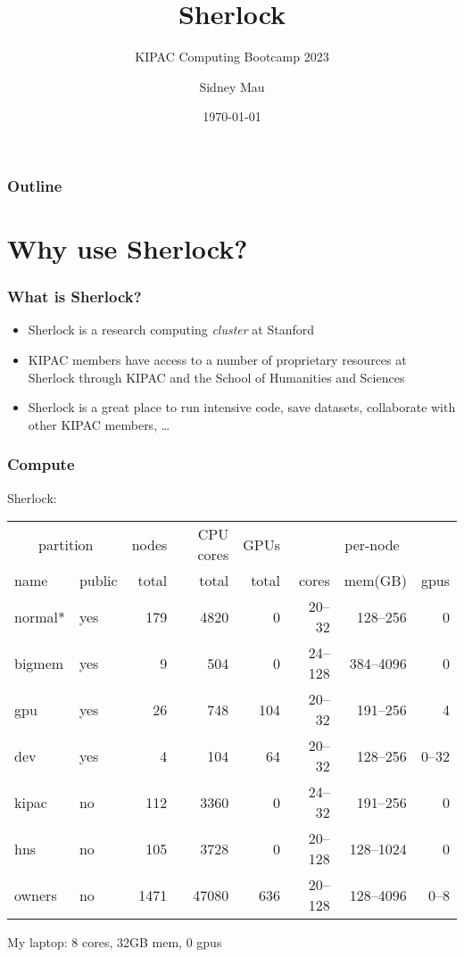 \documentclass[aspectratio=169]{beamer}
\title{Sherlock}
\subtitle{KIPAC Computing Bootcamp 2023}
\author[S. Mau]{Sidney Mau}
\institute[Stanford]{Stanford University}
\date[\today]{\today}
\begin{document}

\frame{\titlepage}

\begin{frame}
	\frametitle{Outline}
	\tableofcontents
\end{frame}


\section{Why use Sherlock?}

\frame{\sectionpage}

\begin{frame}
	\frametitle{What is Sherlock?}
	\begin{itemize}
		\item Sherlock is a research computing \emph{cluster} at Stanford
		\item KIPAC members have access to a number of proprietary resources at Sherlock through KIPAC and the School of Humanities and Sciences
		\item Sherlock is a great place to run intensive code, save datasets, collaborate with other KIPAC members, \dots
	\end{itemize}
\end{frame}

\begin{frame}
	\frametitle{Compute}
	Sherlock:
	\begin{center}
		\begin{tabular}{|l|l||r|r|r||r|r|r|}
			\hline
			\multicolumn{2}{|c||}{partition} & nodes & CPU cores & GPUs & \multicolumn{3}{|c|}{per-node} \\
			 name      &  public & total &     total & total &  cores &  mem(GB) & gpus \\
			\hline
			 normal*   &  yes    &   179 &      4820 &     0 &  20--32 &  128--256 &    0 \\
			 bigmem    &  yes    &     9 &       504 &     0 & 24--128 & 384--4096 &    0 \\
			 gpu       &  yes    &    26 &       748 &   104 &  20--32 &  191--256 &    4 \\
			 dev       &  yes    &     4 &       104 &    64 &  20--32 &  128--256 & 0--32 \\
			\hline
			 kipac     &  no     &   112 &      3360 &     0 &  24--32 &  191--256 &    0 \\
			 hns       &  no     &   105 &      3728 &     0 & 20--128 & 128--1024 &    0 \\
			\hline
			 owners    &  no     &  1471 &     47080 &   636 & 20--128 & 128--4096 &  0--8 \\
			\hline
		\end{tabular}
	\end{center}
	My laptop: 8 cores, 32GB mem, 0 gpus
\end{frame}
\end{document}
